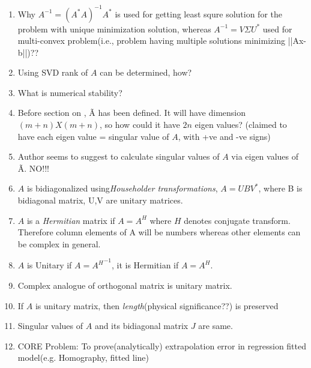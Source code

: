 \documentclass{article}
\begin{document}
\begin{enumerate}
\item Why $A^{-1}=(A^{*}A)^{-1}A^{*}$ is used for getting least squre solution for the problem with unique minimization solution, whereas $A^{-1}=V\Sigma U^{*}$ used for multi-convex problem(i.e., problem having multiple solutions minimizing ||Ax-b||)??

\item Using SVD rank of $A$ can be determined, how?

\item What is numerical stability?

\item Before section on , {\~A} has been defined. It will have dimension $(m+n)X(m+n)$, so how could it have $2n$ eigen values? (claimed to have each eigen value = singular value of $A$, with +ve and -ve signs)

\item Author seems to suggest to calculate singular values of $A$ via eigen values of {\~A}. NO!!!

\item $A$ is bidiagonalized using\textit{Householder transformations}, $A=UBV^{*}$, where B is bidiagonal matrix, U,V are unitary matrices.

\item $A$ is a \textit{Hermitian} matrix if $A=A^{H}$ where $H$ denotes conjugate transform. Therefore column elements of A will be  numbers whereas other elements can be complex in general.

\item $A$ is Unitary if $A={A^{H}}^{-1}$, it is Hermitian if $A=A^{H}$.

\item Complex analogue of orthogonal matrix is unitary matrix.

\item If $A$ is unitary matrix, then \textit{length}(physical significance??) is preserved

\item Singular values of $A$ and its bidiagonal matrix $J$ are same.

\item CORE Problem: To prove(analytically) extrapolation error in regression fitted model(e.g. Homography, fitted line)

\end{enumerate}
\end{document}

